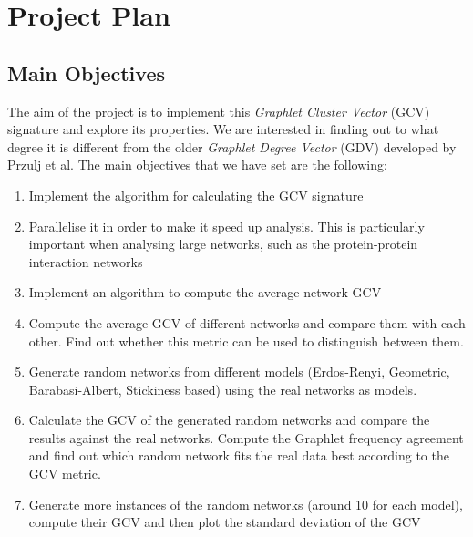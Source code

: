 \chapter{Project Plan}

\section{Main Objectives}

The aim of the project is to implement this \emph{Graphlet Cluster Vector} (GCV)
signature and explore its properties. We are interested in finding out to what
degree it is different from the older \emph{Graphlet Degree Vector} (GDV)
developed by Przulj et al\cite{prvzulj2007biological}. The main objectives that
we have set are the following:
\begin{enumerate}
 \item Implement the algorithm for calculating the GCV signature
 \item Parallelise it in order to make it speed up analysis. This is
particularly important when analysing large networks, such as the
protein-protein interaction networks
 \item Implement an algorithm to compute the average network GCV
 \item Compute the average GCV of different networks and compare them with each
other. Find out whether this metric can be used to distinguish between them.
 \item Generate random networks from different models (Erdos-Renyi, Geometric,
Barabasi-Albert, Stickiness based) using the real networks as models.
 \item Calculate the GCV of the generated random networks and compare the
results against the real networks. Compute the Graphlet frequency agreement
and find out which random network fits the real data best according to the GCV
metric.
 \item Generate more instances of the random networks (around 10 for each
model), compute their GCV and then plot the standard deviation of the GCV
\end{enumerate}

